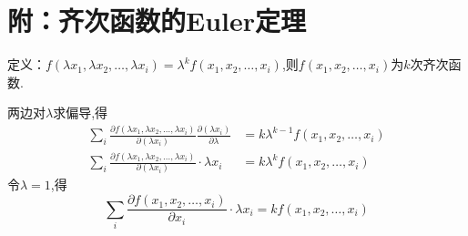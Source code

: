 \section*{附：齐次函数的Euler定理}

定义：$f(\lambda x_1,\lambda x_2,\dots,\lambda x_i) = \lambda^k f(x_1,x_2,\dots,x_i)$,则$f(x_1,x_2,\dots,x_i)$为$k$次齐次函数.

两边对$\lambda$求偏导,得
\begin{align}
\sum\limits_{i}\frac{\partial f(\lambda x_1,\lambda x_2,\dots,\lambda x_i)}{\partial(\lambda x_i)}
\frac{\partial(\lambda x_i)}{\partial \lambda} & = k\lambda^{k-1}f(x_1,x_2,\dots,x_i)\\
\sum_{i}\frac{\partial f(\lambda x_1,\lambda x_2,\dots,\lambda x_i)}{\partial(\lambda x_i)}\cdot
\lambda x_i & = k\lambda^{k}f(x_1,x_2,\dots,x_i)
\end{align}
令$\lambda = 1$,得
\begin{equation}
\sum\limits_{i}\frac{\partial f(x_1, x_2,\dots,x_i)}{\partial x_i}\cdot
\lambda x_i = kf(x_1,x_2,\dots,x_i)
\end{equation}